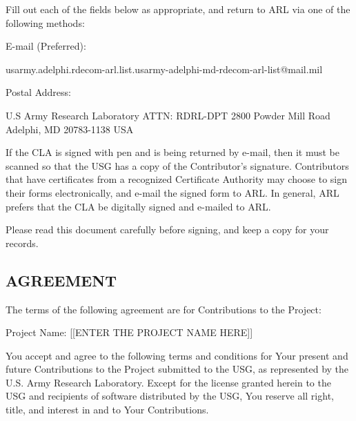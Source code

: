 Fill out each of the fields below as appropriate, and return to ARL via
one of the following methods:

E-mail (Preferred):

usarmy.adelphi.rdecom-arl.list.usarmy-adelphi-md-rdecom-arl-list@mail.mil

Postal Address:

U.S Army Research Laboratory
ATTN: RDRL-DPT 2800 Powder Mill Road
Adelphi, MD 20783-1138 USA

If the CLA is signed with pen and is being returned by e-mail, then it
must be scanned so that the USG has a copy of the Contributor's
signature. Contributors that have certificates from a recognized
Certificate Authority may choose to sign their forms electronically, and
e-mail the signed form to ARL. In general, ARL prefers that the CLA be
digitally signed and e-mailed to ARL.

Please read this document carefully before signing, and keep a copy for
your records.

\subsection{AGREEMENT}\label{agreement}

The terms of the following agreement are for Contributions to the
Project:

Project Name: {[}{[}ENTER THE PROJECT NAME HERE{]}{]}

You accept and agree to the following terms and conditions for Your
present and future Contributions to the Project submitted to the USG, as
represented by the U.S. Army Research Laboratory. Except for the license
granted herein to the USG and recipients of software distributed by the
USG, You reserve all right, title, and interest in and to Your
Contributions.


